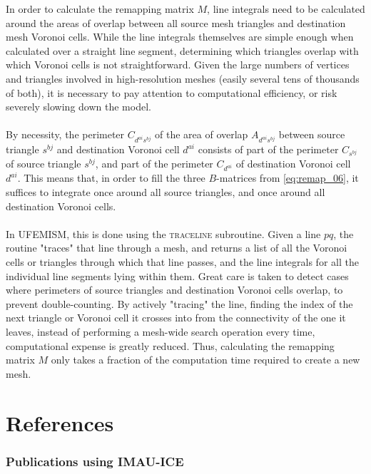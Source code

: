 \documentclass{article}
\begin{document}
In order to calculate the remapping matrix $M$, line integrals need to be calculated around the areas of overlap between all source mesh triangles and destination mesh Voronoi cells. While the line integrals themselves are simple enough when calculated over a straight line segment, determining which triangles overlap with which Voronoi cells is not straightforward. Given the large numbers of vertices and triangles involved in high-resolution meshes (easily several tens of thousands of both), it is necessary to pay attention to computational efficiency, or risk severely slowing down the model.\\
\\
By necessity, the perimeter $C_{d^{ai} s^{bj}}$ of the area of overlap $A_{d^{ai} s^{bj}}$ between source triangle $s^{bj}$ and destination Voronoi cell $d^{ai}$ consists of part of the perimeter $C_{s^{bj}}$ of source triangle $s^{bj}$, and part of the perimeter $C_{d^{ai}}$ of destination Voronoi cell $d^{ai}$. This means that, in order to fill the three $B$-matrices from \eqref{eq:remap_06}, it suffices to integrate once around all source triangles, and once around all destination Voronoi cells.\\
\\
In UFEMISM, this is done using the \textsc{trace\textunderscore line} subroutine. Given a line $pq$, the routine "traces" that line through a mesh, and returns a list of all the Voronoi cells or triangles through which that line passes, and the line integrals for all the individual line segments lying within them. Great care is taken to detect cases where perimeters of source triangles and destination Voronoi cells overlap, to prevent double-counting. By actively "tracing" the line, finding the index of the next triangle or Voronoi cell it crosses into from the connectivity of the one it leaves, instead of performing a mesh-wide search operation every time, computational expense is greatly reduced. Thus, calculating the remapping matrix $M$ only takes a fraction of the computation time required to create a new mesh.

\newpage
\part{References}

\section{Publications using IMAU-ICE}
\end{document}
